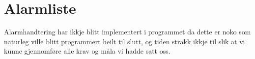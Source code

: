 \section{Alarmliste}
\thispagestyle{fancy}

Alarmhandtering har ikkje blitt implementert i programmet da dette er noko som naturleg ville blitt programmert heilt til slutt,
 og tiden strakk ikkje til slik at vi kunne gjennomføre alle krav og måla vi hadde satt oss.